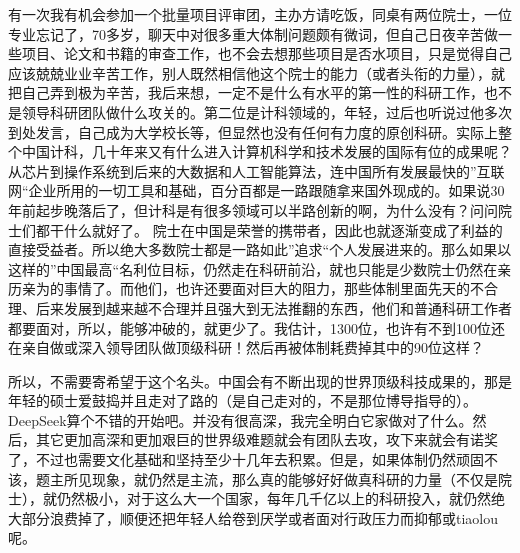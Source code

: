 \documentclass[12pt,twocolumn]{article}
\begin{document}
有一次我有机会参加一个批量项目评审团，主办方请吃饭，同桌有两位院士，一位专业忘记了，70多岁，聊天中对很多重大体制问题颇有微词，但自己日夜辛苦做一些项目、论文和书籍的审查工作，也不会去想那些项目是否水项目，只是觉得自己应该兢兢业业辛苦工作，别人既然相信他这个院士的能力（或者头衔的力量），就把自己弄到极为辛苦，我后来想，一定不是什么有水平的第一性的科研工作，也不是领导科研团队做什么攻关的。第二位是计科领域的，年轻，过后也听说过他多次到处发言，自己成为大学校长等，但显然也没有任何有力度的原创科研。实际上整个中国计科，几十年来又有什么进入计算机科学和技术发展的国际有位的成果呢？从芯片到操作系统到后来的大数据和人工智能算法，连中国所有发展最快的”互联网“企业所用的一切工具和基础，百分百都是一路跟随拿来国外现成的。如果说30年前起步晚落后了，但计科是有很多领域可以半路创新的啊，为什么没有？问问院士们都干什么就好了。
\clearpage
院士在中国是荣誉的携带者，因此也就逐渐变成了利益的直接受益者。所以绝大多数院士都是一路如此”追求“个人发展进来的。那么如果以这样的”中国最高“名利位目标，仍然走在科研前沿，就也只能是少数院士仍然在亲历亲为的事情了。而他们，也许还要面对巨大的阻力，那些体制里面先天的不合理、后来发展到越来越不合理并且强大到无法推翻的东西，他们和普通科研工作者都要面对，所以，能够冲破的，就更少了。我估计，1300位，也许有不到100位还在亲自做或深入领导团队做顶级科研！然后再被体制耗费掉其中的90位这样？

所以，不需要寄希望于这个名头。中国会有不断出现的世界顶级科技成果的，那是年轻的硕士爱鼓捣并且走对了路的（是自己走对的，不是那位博导指导的）。DeepSeek算个不错的开始吧。并没有很高深，我完全明白它家做对了什么。然后，其它更加高深和更加艰巨的世界级难题就会有团队去攻，攻下来就会有诺奖了，不过也需要文化基础和坚持至少十几年去积累。但是，如果体制仍然顽固不该，题主所见现象，就仍然是主流，那么真的能够好好做真科研的力量（不仅是院士），就仍然极小，对于这么大一个国家，每年几千亿以上的科研投入，就仍然绝大部分浪费掉了，顺便还把年轻人给卷到厌学或者面对行政压力而抑郁或tiaolou呢。
\end{document}
